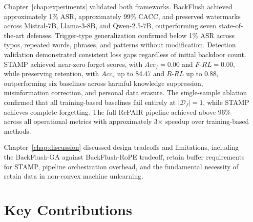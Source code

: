 Chapter~\ref{chap:experiments} validated both frameworks. BackFlush achieved approximately 1\% ASR, approximately 99\% CACC, and preserved watermarks across Mistral-7B, Llama-3-8B, and Qwen-2.5-7B, outperforming seven state-of-the-art defenses. Trigger-type generalization confirmed below 1\% ASR across typos, repeated words, phrases, and patterns without modification. Detection validation demonstrated consistent loss gaps regardless of initial backdoor count. STAMP achieved near-zero forget scores, with $Acc_f = 0.00$ and $F\text{-}RL = 0.00$, while preserving retention, with $Acc_r$ up to 84.47 and $R\text{-}RL$ up to 0.88, outperforming six baselines across harmful knowledge suppression, misinformation correction, and personal data erasure. The single-sample ablation confirmed that all training-based baselines fail entirely at $|\mathcal{D}_f| = 1$, while STAMP achieves complete forgetting. The full RePAIR pipeline achieved above 96\% across all operational metrics with approximately 3$\times$ speedup over training-based methods.

Chapter~\ref{chap:discussion} discussed design tradeoffs and limitations, including the BackFlush-GA against BackFlush-RoPE tradeoff, retain buffer requirements for STAMP, pipeline orchestration overhead, and the fundamental necessity of retain data in non-convex machine unlearning.


\section{Key Contributions}

